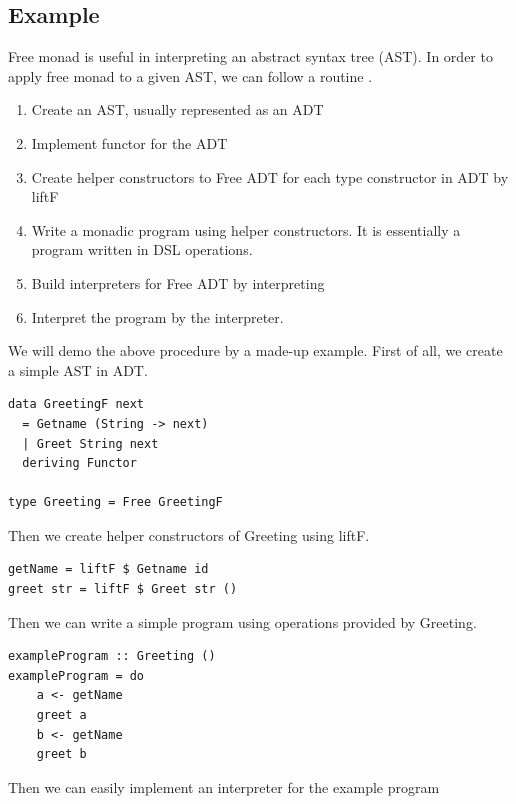 \subsection{Example} \label{b:fm:e}
Free monad is useful in interpreting an abstract syntax tree (AST). In order to apply free monad to a given AST, we can follow a routine \cite{contributorsCatsFreeMonads}.
\begin{enumerate}
  \item Create an AST, usually represented as an ADT
  \item Implement functor for the ADT
  \item Create helper constructors to Free ADT for each type constructor in ADT by liftF 
  \item Write a monadic program using helper constructors. It is essentially a program written in DSL operations.
  \item Build interpreters for Free ADT by interpreting
  \item Interpret the program by the interpreter.
\end{enumerate}
We will demo the above procedure by a made-up example. First of all, we create a simple AST in ADT. 
\begin{code}
\begin{verbatim}
data GreetingF next
  = Getname (String -> next)
  | Greet String next
  deriving Functor

type Greeting = Free GreetingF
\end{verbatim}
\end{code}
Then we create helper constructors of Greeting using liftF.
\begin{verbatim}
getName = liftF $ Getname id
greet str = liftF $ Greet str ()
\end{verbatim}
Then we can write a simple program using operations provided by Greeting.
\begin{verbatim}
exampleProgram :: Greeting ()
exampleProgram = do
    a <- getName
    greet a
    b <- getName
    greet b
\end{verbatim}
Then we can easily implement an interpreter for the example program
